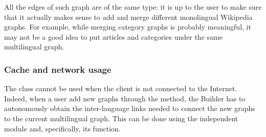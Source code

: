                 All the edges of such graph are of the same type: it is up to the user to make sure that it actually makes sense to add and merge different monolingual Wikipedia graphs. For example, while merging category graphs is probably meaningful, it may not be a good idea to put articles and categories under the same multilingual graph.
            \subsubsection{Cache and network usage}
                The  class cannot be used when the client is not connected to the Internet. Indeed, when a user add new graphs through the  method, the Builder has to autonomously obtain the inter-language links needed to connect the new graphs to the current multilingual graph. This can be done using the independent  module and, specifically, its  function.
                
